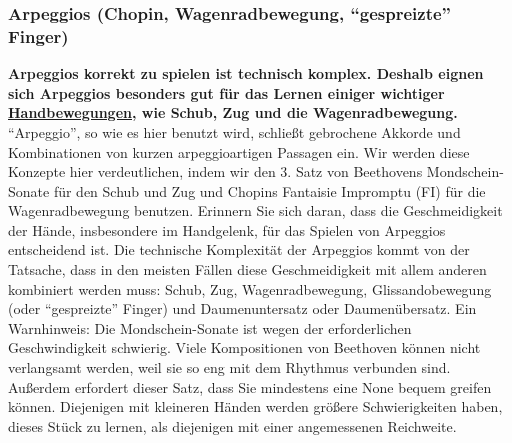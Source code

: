 
\label{c1iii5e}
\subsubsection{Arpeggios (Chopin, Wagenradbewegung, \enquote{gespreizte} Finger)}
\label{Arpeggios}

\textbf{Arpeggios korrekt zu spielen ist technisch komplex.
Deshalb eignen sich Arpeggios besonders gut für das Lernen einiger wichtiger \hyperref[c1iii4]{Handbewegungen}, wie Schub, Zug und die Wagenradbewegung.}
\enquote{Arpeggio}, so wie es hier benutzt wird, schließt gebrochene Akkorde und Kombinationen von kurzen arpeggioartigen Passagen ein.
Wir werden diese Konzepte hier verdeutlichen, indem wir den 3. Satz von Beethovens Mondschein-Sonate für den Schub und Zug und Chopins Fantaisie Impromptu (FI) für die Wagenradbewegung benutzen.
Erinnern Sie sich daran, dass die Geschmeidigkeit der Hände, insbesondere im Handgelenk, für das Spielen von Arpeggios entscheidend ist.
Die technische Komplexität der Arpeggios kommt von der Tatsache, dass in den meisten Fällen diese Geschmeidigkeit mit allem anderen kombiniert werden muss: Schub, Zug, Wagenradbewegung, Glissandobewegung (oder \enquote{gespreizte} Finger) und Daumenuntersatz oder Daumenübersatz.
Ein Warnhinweis: Die Mondschein-Sonate ist wegen der erforderlichen Geschwindigkeit schwierig.
Viele Kompositionen von Beethoven können nicht verlangsamt werden, weil sie so eng mit dem Rhythmus verbunden sind.
Außerdem erfordert dieser Satz, dass Sie mindestens eine None bequem greifen können.
Diejenigen mit kleineren Händen werden größere Schwierigkeiten haben, dieses Stück zu lernen, als diejenigen mit einer angemessenen Reichweite.

